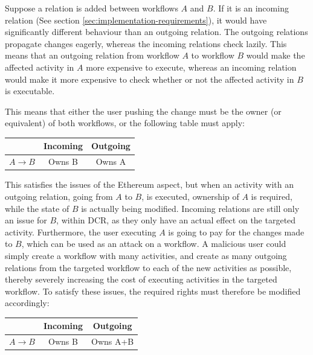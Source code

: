 \documentclass{article}
\begin{document}
			Suppose a relation is added between workflows $A$ and $B$. 
			If it is an incoming relation (See section \ref{sec:implementation-requirements}), it would have significantly different behaviour than an outgoing relation.
			The outgoing relations propagate changes eagerly, whereas the incoming relations check lazily.
			This means that an outgoing relation from workflow $A$ to workflow $B$ would make the affected activity in $A$ more expensive to execute, whereas an incoming relation would make it more expensive to check whether or not the affected activity in $B$ is executable. 

			This means that either the user pushing the change must be the owner (or equivalent) of both workflows, or the following table must apply:
			\begin{table}[!ht]
				\begin{tabular}{|c|c|c|}
				\hline
				 					& Incoming 	& Outgoing \\ \hline
				$A \rightarrow B$ 	& Owns B    & Owns A \\
				\hline
				\end{tabular}
			\end{table}

			This satisfies the issues of the Ethereum aspect, but when an activity with an outgoing relation, going from $A$ to $B$, is executed, ownership of $A$ is required, while the state of $B$ is actually being modified.
			Incoming relations are still only an issue for $B$, within DCR, as they only have an actual effect on the targeted activity.
			Furthermore, the user executing $A$ is going to pay for the changes made to $B$, which can be used as an attack on a workflow.
			A malicious user could simply create a workflow with many activities, and create as many outgoing relations from the targeted workflow to each of the new activities as possible, thereby severely increasing the cost of executing activities in the targeted workflow.
			To satisfy these issues, the required rights must therefore be modified accordingly:

			\begin{table}[!ht]
				\begin{tabular}{|c|c|c|}
				\hline
				 					& Incoming 	& Outgoing \\ \hline
				$A \rightarrow B$ 	& Owns B    & Owns A+B \\
				\hline
				\end{tabular}
			\end{table}
\end{document}
